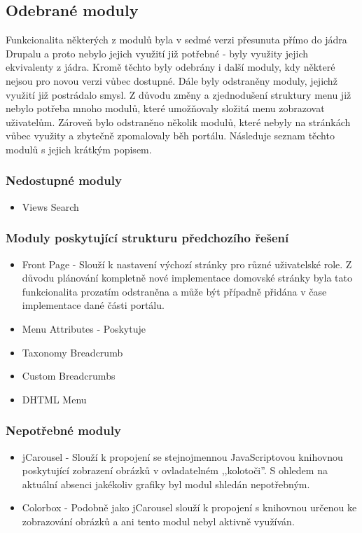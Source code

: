 \subsection{Odebrané moduly}
Funkcionalita některých z modulů byla v sedmé verzi přesunuta přímo do jádra Drupalu a proto nebylo jejich využití již potřebné - byly využity jejich ekvivalenty z jádra. Kromě těchto byly odebrány i další moduly, kdy některé nejsou pro novou verzi vůbec dostupné. Dále byly odstraněny moduly, jejichž využití již postrádalo smysl. Z důvodu změny a zjednodušení struktury menu již nebylo potřeba mnoho modulů, které umožňovaly složitá menu zobrazovat uživatelům. Zároveň bylo odstraněno několik modulů, které nebyly na stránkách vůbec využity a zbytečně zpomalovaly běh portálu. Následuje seznam těchto modulů s jejich krátkým popisem.

\subsubsection*{Nedostupné moduly}
\begin{itemize}
  \item Views Search
\end{itemize}

\subsubsection*{Moduly poskytující strukturu předchozího řešení}
\begin{itemize}
  \item Front Page - Slouží k nastavení výchozí stránky pro různé uživatelské role. Z důvodu plánování kompletně nové implementace domovské stránky byla tato funkcionalita prozatím odstraněna a může být případně přidána v čase implementace dané části portálu.
  \item Menu Attributes - Poskytuje %
  \item Taxonomy Breadcrumb
  \item Custom Breadcrumbs
  \item DHTML Menu
\end{itemize}

\subsubsection*{Nepotřebné moduly}
\begin{itemize}
  \item jCarousel - Slouží k propojení se stejnojmennou JavaScriptovou knihovnou poskytující zobrazení obrázků v ovladatelném ,,kolotoči''. S ohledem na aktuální absenci jakékoliv grafiky byl modul shledán nepotřebným. 
  \item Colorbox - Podobně jako jCarousel slouží k propojení s knihovnou určenou ke zobrazování obrázků a ani tento modul nebyl aktivně využíván.
\end{itemize}

